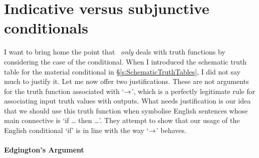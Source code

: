 \section{Indicative versus subjunctive conditionals}\label{s:IndicativeSubjunctive}
I want to bring home the point that \TFL\ \emph{only} deals with truth functions by considering the case of the conditional. When I introduced the schematic truth table for the material conditional in §\ref{s:SchematicTruthTables}, I did not say much to justify it. Let me now offer two justifications. These are not arguments for the truth function associated with `$\rightarrow$', which is a perfectly legitimate rule for associating input truth values with outputs. What needs justification is our idea that we should use this truth function when symbolise English sentences whose main connective is `if … then …'. They attempt to show that our usage of the English conditional `if' is in line with the way `$\rightarrow$' behaves.

\paragraph{Edgington's Argument}


